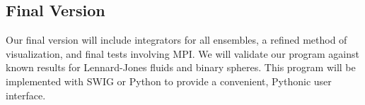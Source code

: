 \documentclass[10pt]{article}
\begin{document}
\subsection{Final Version}
Our final version will include integrators for all ensembles, a refined method of visualization, and final tests involving MPI.  We will validate our program against known results for Lennard-Jones fluids and binary spheres.  This program will be implemented with SWIG or Python to provide a convenient, Pythonic user interface.
\end{document}
